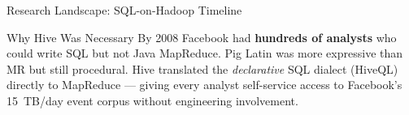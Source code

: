 \documentclass[aspectratio=169,10pt]{beamer}
\begin{document}
\begin{frame}{Research Landscape: SQL-on-Hadoop Timeline}
\begin{center}
  \end{center}
  \vspace{4pt}
  \begin{alertblock}{Why Hive Was Necessary}
    By 2008 Facebook had \textbf{hundreds of analysts} who could write SQL
    but not Java MapReduce.
    Pig Latin was more expressive than MR but still procedural.
    Hive translated the \emph{declarative} SQL dialect (HiveQL) directly
    to MapReduce — giving every analyst self-service access to
    Facebook's 15~TB/day event corpus without engineering involvement.
  \end{alertblock}
\end{frame}
\end{document}
